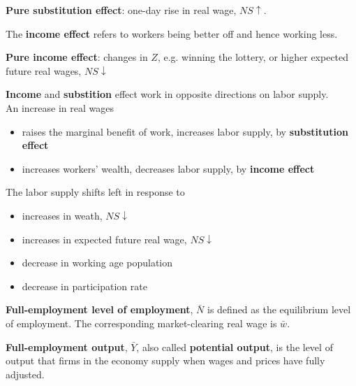 \documentclass[letterpaper, 9pt,landscape]{extarticle}
\begin{document}
\begin{multicols*}{5}
\begin{remark}
    \textbf{Pure substitution effect}: one-day rise in real wage, $NS \uparrow$.  \\
\end{remark}

\begin{definition}
    The \textbf{income effect} refers to workers being better off and hence working less.
\end{definition}
\begin{remark}
    \textbf{Pure income effect}: changes in $Z$, e.g. winning the lottery, or higher expected future real wages, $NS \downarrow$ \\
\end{remark}

\begin{remark} 
    \textbf{Income} and \textbf{substition} effect work in opposite directions on labor supply.  \\

    An increase in real wages 
    \begin{itemize}
        \item raises the marginal benefit of work, increases labor supply, by \textbf{substitution effect}
        \item increases workers' wealth, decreases labor supply, by \textbf{income effect}
    \end{itemize}   
\end{remark}


\begin{remark}
The labor supply shifts left in response to 
\begin{itemize}
    \item increases in weath, $NS \downarrow$
    \item increases in expected future real wage, $NS \downarrow$
    \item decrease in working age population
    \item decrease in participation rate
\end{itemize} 
\end{remark}

\begin{definition}
    \textbf{Full-employment level of employment}, $ \bar{N} $ is defined as the equilibrium level of employment. The corresponding market-clearing real wage is $ \bar{w} $.
\end{definition}

\begin{definition}
    \textbf{Full-employment output}, $\bar{Y}$, also called \textbf{potential output}, is the level of output that firms in the economy supply when wages and prices have fully adjusted. 


\end{definition}
\end{multicols*}
\end{document}

